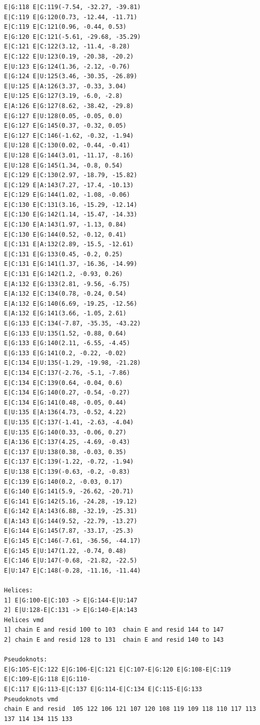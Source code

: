 \documentclass[12pt]{article}
\begin{document}
\begin{appendices}
\begin{scriptsize}
\begin{lstlisting}
E|G:118 E|C:119(-7.54, -32.27, -39.81)
E|C:119 E|G:120(0.73, -12.44, -11.71)
E|C:119 E|C:121(0.96, -0.44, 0.53)
E|G:120 E|C:121(-5.61, -29.68, -35.29)
E|C:121 E|C:122(3.12, -11.4, -8.28)
E|C:122 E|U:123(0.19, -20.38, -20.2)
E|U:123 E|G:124(1.36, -2.12, -0.76)
E|G:124 E|U:125(3.46, -30.35, -26.89)
E|U:125 E|A:126(3.37, -0.33, 3.04)
E|U:125 E|G:127(3.19, -6.0, -2.8)
E|A:126 E|G:127(8.62, -38.42, -29.8)
E|G:127 E|U:128(0.05, -0.05, 0.0)
E|G:127 E|G:145(0.37, -0.32, 0.05)
E|G:127 E|C:146(-1.62, -0.32, -1.94)
E|U:128 E|C:130(0.02, -0.44, -0.41)
E|U:128 E|G:144(3.01, -11.17, -8.16)
E|U:128 E|G:145(1.34, -0.8, 0.54)
E|C:129 E|C:130(2.97, -18.79, -15.82)
E|C:129 E|A:143(7.27, -17.4, -10.13)
E|C:129 E|G:144(1.02, -1.08, -0.06)
E|C:130 E|C:131(3.16, -15.29, -12.14)
E|C:130 E|G:142(1.14, -15.47, -14.33)
E|C:130 E|A:143(1.97, -1.13, 0.84)
E|C:130 E|G:144(0.52, -0.12, 0.41)
E|C:131 E|A:132(2.89, -15.5, -12.61)
E|C:131 E|G:133(0.45, -0.2, 0.25)
E|C:131 E|G:141(1.37, -16.36, -14.99)
E|C:131 E|G:142(1.2, -0.93, 0.26)
E|A:132 E|G:133(2.81, -9.56, -6.75)
E|A:132 E|C:134(0.78, -0.24, 0.54)
E|A:132 E|G:140(6.69, -19.25, -12.56)
E|A:132 E|G:141(3.66, -1.05, 2.61)
E|G:133 E|C:134(-7.87, -35.35, -43.22)
E|G:133 E|U:135(1.52, -0.88, 0.64)
E|G:133 E|G:140(2.11, -6.55, -4.45)
E|G:133 E|G:141(0.2, -0.22, -0.02)
E|C:134 E|U:135(-1.29, -19.98, -21.28)
E|C:134 E|C:137(-2.76, -5.1, -7.86)
E|C:134 E|C:139(0.64, -0.04, 0.6)
E|C:134 E|G:140(0.27, -0.54, -0.27)
E|C:134 E|G:141(0.48, -0.05, 0.44)
E|U:135 E|A:136(4.73, -0.52, 4.22)
E|U:135 E|C:137(-1.41, -2.63, -4.04)
E|U:135 E|G:140(0.33, -0.06, 0.27)
E|A:136 E|C:137(4.25, -4.69, -0.43)
E|C:137 E|U:138(0.38, -0.03, 0.35)
E|C:137 E|C:139(-1.22, -0.72, -1.94)
E|U:138 E|C:139(-0.63, -0.2, -0.83)
E|C:139 E|G:140(0.2, -0.03, 0.17)
E|G:140 E|G:141(5.9, -26.62, -20.71)
E|G:141 E|G:142(5.16, -24.28, -19.12)
E|G:142 E|A:143(6.88, -32.19, -25.31)
E|A:143 E|G:144(9.52, -22.79, -13.27)
E|G:144 E|G:145(7.87, -33.17, -25.3)
E|G:145 E|C:146(-7.61, -36.56, -44.17)
E|G:145 E|U:147(1.22, -0.74, 0.48)
E|C:146 E|U:147(-0.68, -21.82, -22.5)
E|U:147 E|C:148(-0.28, -11.16, -11.44)

Helices: 
1] E|G:100-E|C:103 -> E|G:144-E|U:147
2] E|U:128-E|C:131 -> E|G:140-E|A:143
Helices vmd
1] chain E and resid 100 to 103  chain E and resid 144 to 147
2] chain E and resid 128 to 131  chain E and resid 140 to 143

Pseudoknots:
E|G:105-E|C:122 E|G:106-E|C:121 E|C:107-E|G:120 E|G:108-E|C:119 E|C:109-E|G:118 E|G:110-
E|C:117 E|G:113-E|C:137 E|G:114-E|C:134 E|C:115-E|G:133 
Pseudoknots vmd
chain E and resid  105 122 106 121 107 120 108 119 109 118 110 117 113 137 114 134 115 133 


\end{lstlisting}
\end{scriptsize}
\end{appendices}
\end{document}
